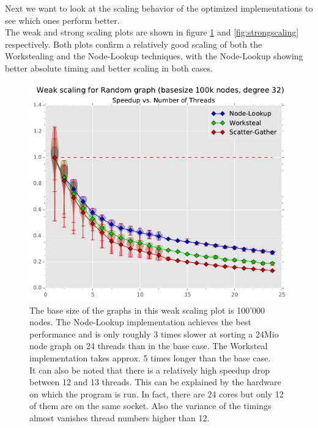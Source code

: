 Next we want to look at the scaling behavior of the optimized implementations to see which ones perform better. \\
The weak and strong scaling plots are shown in figure \ref{fig:weakscaling} and \ref{fig:strongscaling} respectively.
Both plots confirm a relatively good scaling of both the Workstealing and the Node-Lookup techniques, with the Node-Lookup showing better absolute timing and better scaling in both cases. \\
%
\begin{figure}[ht]
	\centering
	\includegraphics[width=\columnwidth]{plots/weakscaling_gtRANDOMLIN32_n1000000_deg32.pdf}
	\caption{The base size of the graphs in this weak scaling plot is 100'000 nodes.
		The Node-Lookup implementation achieves the best performance and is only roughly 3 times slower at sorting a 24Mio node graph on 24 threads than in the base case. The Worksteal implementation takes approx. 5 times longer than the base case. \\
	It can also be noted that there is a relatively high speedup drop between 12 and 13 threads.
	This can be explained by the hardware on which the program is run. In fact, there are 24 cores but only 12 of them are on the same socket.
	Also the variance of the timings almost vanishes thread numbers higher than 12.
}
	\label{fig:weakscaling}
\end{figure}
%
